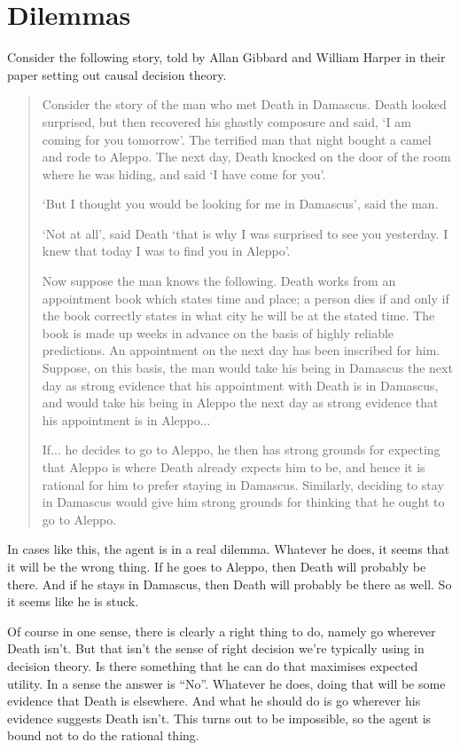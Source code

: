 \section{Dilemmas}
Consider the following story, told by Allan Gibbard and William Harper in their paper setting out causal decision theory. \begin{quote}
Consider the story of the man who met Death in Damascus. Death looked surprised, but then recovered his ghastly composure and said, 
`I {\sc am coming for you tomorrow}'. The terrified man that night bought a camel and rode to Aleppo. The next day, Death knocked on the door of the room where he was hiding, and said `I {\sc have come for you}'. 

`But I thought you would be looking for me in Damascus', said the man.
 
`{\sc Not at all}', said Death `{\sc that is why I was surprised to see you yesterday. I knew that today I was to find you in Aleppo}'. 

Now suppose the man knows the following. Death works from an appointment book which states time and place; a person dies if and only if the book correctly states in what city he will be at the stated time. The book is made up weeks in advance on the basis of highly reliable predictions. An appointment on the next day has been inscribed for him. Suppose, on this basis, the man would take his being in Damascus the next day as strong evidence that his appointment with Death is in Damascus, and would take his being in Aleppo the next day as strong evidence that his appointment is in Aleppo...
 
If... he decides to go to Aleppo, he then has strong grounds for expecting that Aleppo is where Death already expects him to be, and hence it is rational for him to prefer staying in Damascus. Similarly, deciding to stay in Damascus would give him strong grounds for thinking that he ought to go to Aleppo.
\end{quote}
In cases like this, the agent is in a real dilemma. Whatever he does, it seems that it will be the wrong thing. If he goes to Aleppo, then Death will probably be there. And if he stays in Damascus, then Death will probably be there as well. So it seems like he is stuck.

Of course in one sense, there is clearly a right thing to do, namely go wherever Death isn't. But that isn't the sense of right decision we're typically using in decision theory. Is there something that he can do that maximises expected utility. In a sense the answer is ``No''. Whatever he does, doing that will be some evidence that Death is elsewhere. And what he should do is go wherever his evidence suggests Death isn't. This turns out to be impossible, so the agent is bound not to do the rational thing.

